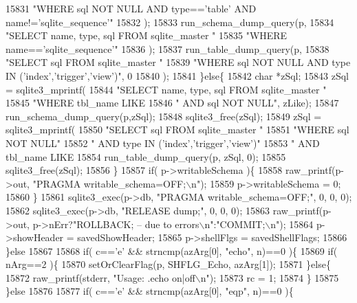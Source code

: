 \begin{DoxyCode}
{{{{{{{{{{{15831         \textcolor{stringliteral}{"WHERE sql NOT NULL AND type=='table' AND name!='sqlite\_sequence'"}
15832       );
15833       run_schema_dump_query(p,
15834         \textcolor{stringliteral}{"SELECT name, type, sql FROM sqlite\_master "}
15835         \textcolor{stringliteral}{"WHERE name=='sqlite\_sequence'"}
15836       );
15837       run_table_dump_query(p,
15838         \textcolor{stringliteral}{"SELECT sql FROM sqlite\_master "}
15839         \textcolor{stringliteral}{"WHERE sql NOT NULL AND type IN ('index','trigger','view')"}, 0
15840       );
15841     \}\textcolor{keywordflow}{else}\{
15842       \textcolor{keywordtype}{char} *zSql;
15843       zSql = sqlite3_mprintf(
15844         \textcolor{stringliteral}{"SELECT name, type, sql FROM sqlite\_master "}
15845         \textcolor{stringliteral}{"WHERE tbl\_name LIKE %
15846         \textcolor{stringliteral}{"  AND sql NOT NULL"}, zLike);
15847       run_schema_dump_query(p,zSql);
15848       sqlite3_free(zSql);
15849       zSql = sqlite3_mprintf(
15850         \textcolor{stringliteral}{"SELECT sql FROM sqlite\_master "}
15851         \textcolor{stringliteral}{"WHERE sql NOT NULL"}
15852         \textcolor{stringliteral}{"  AND type IN ('index','trigger','view')"}
15853         \textcolor{stringliteral}{"  AND tbl\_name LIKE %
15854       run_table_dump_query(p, zSql, 0);
15855       sqlite3_free(zSql);
15856     \}
15857     \textcolor{keywordflow}{if}( p->writableSchema )\{
15858       raw_printf(p->out, \textcolor{stringliteral}{"PRAGMA writable\_schema=OFF;\(\backslash\)n"});
15859       p->writableSchema = 0;
15860     \}
15861     sqlite3_exec(p->db, \textcolor{stringliteral}{"PRAGMA writable\_schema=OFF;"}, 0, 0, 0);
15862     sqlite3_exec(p->db, \textcolor{stringliteral}{"RELEASE dump;"}, 0, 0, 0);
15863     raw_printf(p->out, p->nErr?\textcolor{stringliteral}{"ROLLBACK; -- due to errors\(\backslash\)n"}:\textcolor{stringliteral}{"COMMIT;\(\backslash\)n"});
15864     p->showHeader = savedShowHeader;
15865     p->shellFlgs = savedShellFlags;
15866   \}\textcolor{keywordflow}{else}
15867 
15868   \textcolor{keywordflow}{if}( c==\textcolor{charliteral}{'e'} && strncmp(azArg[0], \textcolor{stringliteral}{"echo"}, n)==0 )\{
15869     \textcolor{keywordflow}{if}( nArg==2 )\{
15870       setOrClearFlag(p, SHFLG_Echo, azArg[1]);
15871     \}\textcolor{keywordflow}{else}\{
15872       raw_printf(stderr, \textcolor{stringliteral}{"Usage: .echo on|off\(\backslash\)n"});
15873       rc = 1;
15874     \}
15875   \}\textcolor{keywordflow}{else}
15876 
15877   \textcolor{keywordflow}{if}( c==\textcolor{charliteral}{'e'} && strncmp(azArg[0], \textcolor{stringliteral}{"eqp"}, n)==0 )\{
}}}}}}}}}}}}}
\end{DoxyCode}

